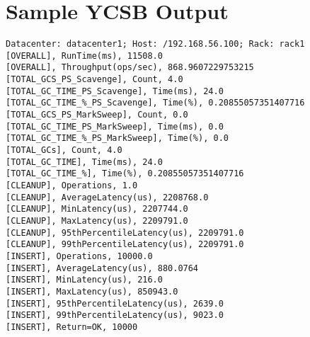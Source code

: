\chapter{Sample YCSB Output} 

\label{SampleYCSBOutput} 


\begin{verbatim}
Datacenter: datacenter1; Host: /192.168.56.100; Rack: rack1
[OVERALL], RunTime(ms), 11508.0
[OVERALL], Throughput(ops/sec), 868.9607229753215
[TOTAL_GCS_PS_Scavenge], Count, 4.0
[TOTAL_GC_TIME_PS_Scavenge], Time(ms), 24.0
[TOTAL_GC_TIME_%_PS_Scavenge], Time(%), 0.20855057351407716
[TOTAL_GCS_PS_MarkSweep], Count, 0.0
[TOTAL_GC_TIME_PS_MarkSweep], Time(ms), 0.0
[TOTAL_GC_TIME_%_PS_MarkSweep], Time(%), 0.0
[TOTAL_GCs], Count, 4.0
[TOTAL_GC_TIME], Time(ms), 24.0
[TOTAL_GC_TIME_%], Time(%), 0.20855057351407716
[CLEANUP], Operations, 1.0
[CLEANUP], AverageLatency(us), 2208768.0
[CLEANUP], MinLatency(us), 2207744.0
[CLEANUP], MaxLatency(us), 2209791.0
[CLEANUP], 95thPercentileLatency(us), 2209791.0
[CLEANUP], 99thPercentileLatency(us), 2209791.0
[INSERT], Operations, 10000.0
[INSERT], AverageLatency(us), 880.0764
[INSERT], MinLatency(us), 216.0
[INSERT], MaxLatency(us), 850943.0
[INSERT], 95thPercentileLatency(us), 2639.0
[INSERT], 99thPercentileLatency(us), 9023.0
[INSERT], Return=OK, 10000
\end{verbatim}